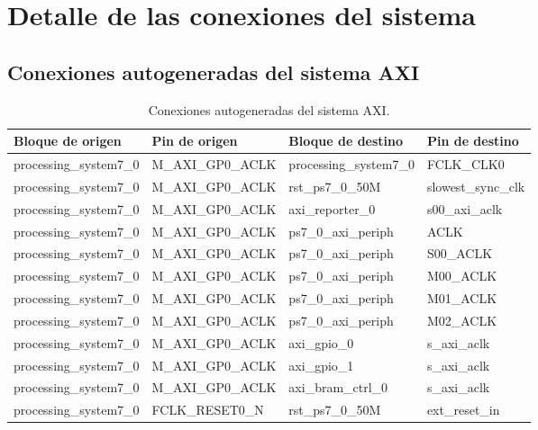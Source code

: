 
\chapter{Detalle de las conexiones del sistema}
\label{ap:conexiones}

\section{Conexiones autogeneradas del sistema AXI}

\begin{table}[!ht]
    \centering
    \caption{Conexiones autogeneradas del sistema AXI.}
    \label{tab:autogenate conexion}
    \begin{tabular}{|l|l|l|l|}
    \hline
        Bloque de origen        & Pin de origen         & Bloque de destino         & Pin de destino \\ \hline
        processing\_system7\_0  & M\_AXI\_GP0\_ACLK     & processing\_system7\_0    & FCLK\_CLK0 \\ \hline
        processing\_system7\_0  & M\_AXI\_GP0\_ACLK     & rst\_ps7\_0\_50M          & slowest\_sync\_clk \\ \hline
        processing\_system7\_0  & M\_AXI\_GP0\_ACLK     & axi\_reporter\_0          & s00\_axi\_aclk \\ \hline
        processing\_system7\_0  & M\_AXI\_GP0\_ACLK     & ps7\_0\_axi\_periph       & ACLK \\ \hline
        processing\_system7\_0  & M\_AXI\_GP0\_ACLK     & ps7\_0\_axi\_periph       & S00\_ACLK \\ \hline
        processing\_system7\_0  & M\_AXI\_GP0\_ACLK     & ps7\_0\_axi\_periph       & M00\_ACLK \\ \hline
        processing\_system7\_0  & M\_AXI\_GP0\_ACLK     & ps7\_0\_axi\_periph       & M01\_ACLK \\ \hline
        processing\_system7\_0  & M\_AXI\_GP0\_ACLK     & ps7\_0\_axi\_periph       & M02\_ACLK \\ \hline
        processing\_system7\_0  & M\_AXI\_GP0\_ACLK     & axi\_gpio\_0              & s\_axi\_aclk \\ \hline
        processing\_system7\_0  & M\_AXI\_GP0\_ACLK     & axi\_gpio\_1              & s\_axi\_aclk \\ \hline
        processing\_system7\_0  & M\_AXI\_GP0\_ACLK     & axi\_bram\_ctrl\_0        & s\_axi\_aclk \\ \hline
        processing\_system7\_0  & FCLK\_RESET0\_N       & rst\_ps7\_0\_50M          & ext\_reset\_in \\ \hline

\end{tabular}
\end{table}
